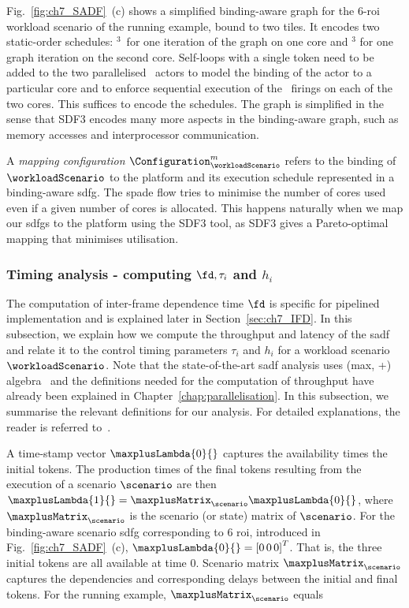 Fig.~\ref{fig:ch7_SADF}~(c) shows a simplified binding-aware graph for the 6-\gls{roi} workload scenario of the running example, bound to two tiles. It encodes two static-order schedules: \taskISP\taskRoID\taskRoIP$^3$\taskRoIM\taskC\taskA\ for one iteration of the graph on one core and \taskRoIP$^3$ for one graph iteration on the second core. Self-loops with a single token need to be added to the two parallelised \taskRoIP\ actors to model the binding of the actor to a particular core and to enforce sequential execution of the \taskRoIP\ firings on each of the two cores. This suffices to encode the schedules. The graph is simplified in the sense that SDF3 encodes many more aspects in the binding-aware graph, such as memory accesses and interprocessor communication. 

A \emph{mapping configuration} $\Configuration_{\workloadScenario}^m$ refers to the binding of $\workloadScenario$ to the platform and its execution schedule represented in a binding-aware \gls{sdfg}.
The \gls{spade} flow tries to minimise the number of cores used even if a given number of cores is allocated. This happens naturally when we map our \glspl{sdfg} to the platform using the SDF3 tool, as SDF3 gives a Pareto-optimal mapping that minimises utilisation.

\subsubsection{Timing analysis - computing $\fd, \tau_i$ and $h_i$}
The computation of inter-frame dependence time $\fd$ is specific for pipelined implementation and is explained later in Section~\ref{sec:ch7_IFD}. In this subsection, we explain how we compute the throughput and latency of the \gls{sadf} and relate it to the control timing parameters $\tau_i$ and $h_i$ for a workload scenario $\workloadScenario$.
Note that the state-of-the-art \gls{sadf} analysis uses (max, +) algebra~\cite{baccelli1992synchronization} and the definitions needed for the computation of throughput have already been explained in Chapter~\ref{chap:parallelisation}.
In this subsection, we summarise the relevant definitions for our analysis.
 For detailed explanations, the reader is referred to~\cite{ara2018scalable}.

A time-stamp vector $\maxplusLambda{0}{}$ captures the availability times the initial tokens.
The production times of the final tokens resulting from the execution of a scenario $\scenario$ are then $\maxplusLambda{1}{} = \maxplusMatrix_{\scenario} \maxplusLambda{0}{}$, where $\maxplusMatrix_{\scenario}$ is the scenario (or state) matrix of $\scenario$.
For the binding-aware scenario \gls{sdfg} corresponding to 6 \gls{roi}, introduced in Fig.~\ref{fig:ch7_SADF}~(c), 
$\maxplusLambda{0}{}=\left[ 0\, 0\, 0\right]^T$. That is, the three initial tokens are all available at time 0. Scenario matrix $\maxplusMatrix_{\scenario}$ captures the dependencies and corresponding delays between the initial and final tokens. For the running example, $\maxplusMatrix_{\scenario}$ equals

